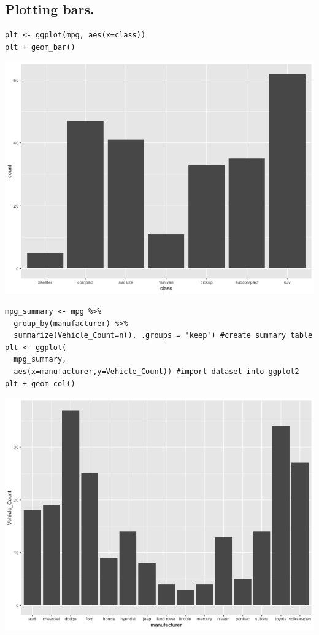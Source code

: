 \documentclass[11pt]{article}
\begin{document}
\subsection{Plotting bars.}
\label{sec:orgb18b0f4}

\begin{verbatim}
plt <- ggplot(mpg, aes(x=class))
plt + geom_bar()
\end{verbatim}

\begin{org}
\begin{center}
\includegraphics[width=.9\linewidth]{./resources/mpg1.png}
\end{center}
\end{org}

\begin{verbatim}
mpg_summary <- mpg %>%
  group_by(manufacturer) %>%
  summarize(Vehicle_Count=n(), .groups = 'keep') #create summary table
plt <- ggplot(
  mpg_summary,
  aes(x=manufacturer,y=Vehicle_Count)) #import dataset into ggplot2
plt + geom_col()
\end{verbatim}

\begin{org}
\begin{center}
\includegraphics[width=.9\linewidth]{./resources/mpg2.png}
\end{center}
\end{org}
\end{document}
